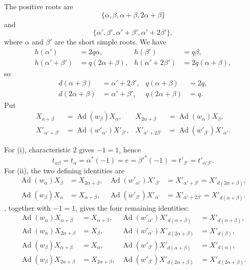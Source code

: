 The positive roots are
\[
 \{\alpha,\beta,\alpha+\beta,2\alpha+\beta\}
\]
and
\[
 \{\alpha',\beta',\alpha'+\beta',\alpha'+2\beta'\},
\]
where \(\alpha\) and \(\beta'\) are the short simple roots. We have
\[
\begin{aligned}
 h(\alpha')&=2q\alpha,&h(\beta')&=q\beta,\\
 h(\alpha'+\beta')&=q(2\alpha+\beta),&
 h(\alpha'+2\beta')&=2q(\alpha+\beta),
\end{aligned}
\]
so
\[
\begin{aligned}
 d(\alpha+\beta)&=\alpha'+2\beta',&q(\alpha+\beta)&=2q,\\
 d(2\alpha+\beta)&=\alpha'+\beta',&q(2\alpha+\beta)&=q.
\end{aligned}
\]
Put
\[
\begin{aligned}
 X_{\alpha+\beta}&=\operatorname{Ad}(w_\beta)X_\alpha,&
 X_{2\alpha+\beta}&=\operatorname{Ad}(w_\alpha)X_\beta,\\
 X'_{\alpha'+\beta'}&=\operatorname{Ad}(w'_{\alpha'})X'_{\beta'},&
 X'_{\alpha'+2\beta'}&=\operatorname{Ad}(w'_{\beta'})X'_{\alpha'}.
\end{aligned}
\]

For (i), characteristic \(2\) gives \(-1=1\), hence
\[
 t_{\alpha\beta}=t_\alpha=\alpha^*(-1)=e
   =\beta'^*(-1)=t'_{\beta'}=t'_{\alpha'\beta'}.
\]
For (ii), the two defining identities are
\[
\begin{aligned}
 \operatorname{Ad}(w_\alpha)X_\beta
  &=X_{2\alpha+\beta},&
 \operatorname{Ad}(w'_{\alpha'})X'_{\beta'}
  &=X'_{\alpha'+\beta'}=X'_{d(2\alpha+\beta)},\\
 \operatorname{Ad}(w_\beta)X_\alpha
  &=X_{\alpha+\beta},&
 \operatorname{Ad}(w'_{\beta'})X'_{\alpha'}
  &=X'_{\alpha'+2\beta'}=X'_{d(\alpha+\beta)}.
\end{aligned}
\]
, together with \(-1=1\), gives the four
remaining identities:
\[
\begin{aligned}
 \operatorname{Ad}(w_\alpha)X_{\alpha+\beta}&=X_{\alpha+\beta},&
 \operatorname{Ad}(w'_{\alpha'})X'_{d(\alpha+\beta)}
   &=X'_{d(\alpha+\beta)},\\
 \operatorname{Ad}(w_\alpha)X_{2\alpha+\beta}&=X_\beta,&
 \operatorname{Ad}(w'_{\alpha'})X'_{d(2\alpha+\beta)}
   &=X'_{d(\beta)},\\
 \operatorname{Ad}(w_\beta)X_{\alpha+\beta}&=X_\alpha,&
 \operatorname{Ad}(w'_{\beta'})X'_{d(\alpha+\beta)}
   &=X'_{d(\alpha)},\\
 \operatorname{Ad}(w_\beta)X_{2\alpha+\beta}&=X_{2\alpha+\beta},&
 \operatorname{Ad}(w'_{\beta'})X'_{d(2\alpha+\beta)}
   &=X'_{d(2\alpha+\beta)}.
\end{aligned}
\]

